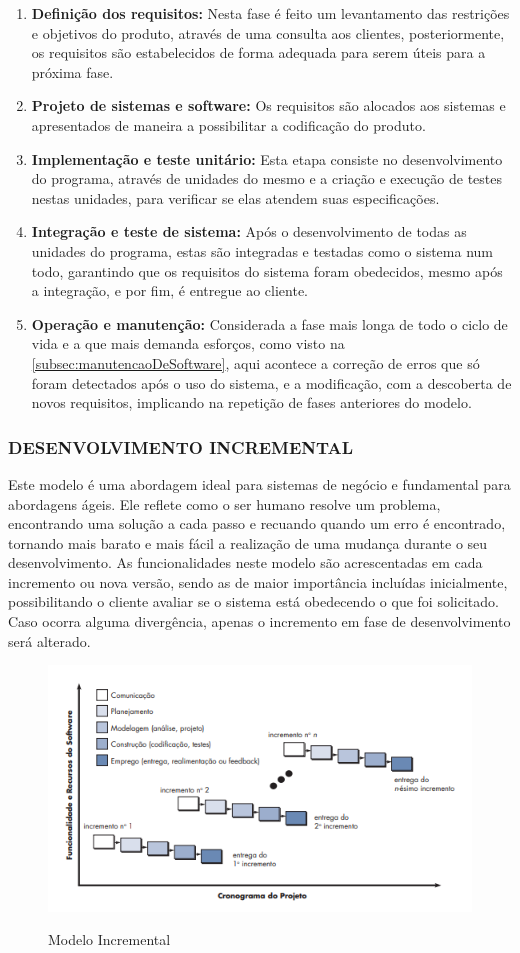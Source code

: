 \begin{enumerate}
    \item \textbf{Definição dos requisitos:} Nesta fase é feito um levantamento das restrições e objetivos do produto, através de uma consulta aos clientes, posteriormente, os requisitos são estabelecidos de forma adequada para serem úteis para a próxima fase.
    \item \textbf{Projeto de sistemas e software:} Os requisitos são alocados aos sistemas e apresentados de maneira a possibilitar a codificação do produto.
    \item \textbf{Implementação e teste unitário:} Esta etapa consiste no desenvolvimento do programa, através de unidades do mesmo e a criação e execução de testes nestas unidades, para verificar se elas atendem suas especificações. 
    \item \textbf{Integração e teste de sistema:} Após o desenvolvimento de todas as unidades do programa, estas são integradas e testadas como o sistema num todo, garantindo que os requisitos do sistema foram obedecidos, mesmo após a integração, e por fim, é entregue ao cliente.
    \item \textbf{Operação e manutenção:} Considerada a fase mais longa de todo o ciclo de vida e a que mais demanda esforços, como visto na \autoref{subsec:manutencaoDeSoftware}, aqui acontece a correção de erros que só foram detectados após o uso do sistema, e a modificação, com a descoberta de novos requisitos, implicando na repetição de fases anteriores do modelo. 
\end{enumerate}

\subsubsection{DESENVOLVIMENTO INCREMENTAL}
\label{subsubsec:modeloIncremental}

Este modelo é uma abordagem ideal para sistemas de negócio e fundamental para abordagens ágeis. Ele reflete como o ser humano resolve um problema, encontrando uma solução a cada passo e recuando quando um erro é encontrado, tornando mais barato e mais fácil a realização de uma mudança durante o seu desenvolvimento. As funcionalidades neste modelo são acrescentadas em cada incremento ou nova versão, sendo as de maior importância incluídas inicialmente, possibilitando o cliente avaliar se o sistema está obedecendo o que foi solicitado. Caso ocorra alguma divergência, apenas o incremento em fase de desenvolvimento será alterado.

\begin{figure}[!htb]
    \centering
    \caption{Modelo Incremental}
    \includegraphics[width=1\textwidth]{./dados/figuras/modeloIncremental}
    \label{fig:figura-modelo-incremental}
\end{figure}